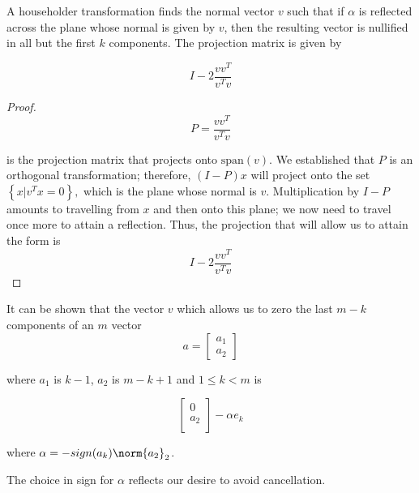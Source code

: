 \documentclass[../main.tex]{subfiles}
\begin{document}
\begin{proposition}
    A householder transformation finds the normal vector $v$ such that if $\alpha$ is reflected across the plane whose normal is given by $v$, then the resulting vector is nullified in all but the first $k$ components. The projection matrix is given by 

    \[
        I - 2 \frac{v v^T}{v^Tv}
    \]
\end{proposition}
\begin{proof}
    \[
        P = \frac{vv^T}{v^Tv}
    \]

    is the projection matrix that projects onto $\text{span}(v)$. We established that $P$ is an orthogonal transformation; therefore, $(I - P)x$ will project onto the set $\left\{ x | v^Tx = 0 \right\},$ which is the plane whose normal is $v$. Multiplication by $I - P$ amounts to travelling from $x$ and then onto this plane; we now need to travel once more to attain a reflection. Thus, the projection that will allow us to attain the form is
    \[
        I - 2 \frac{v v^T}{v^Tv}
    \]
\end{proof}

\begin{proposition}
    It can be shown that the vector $v$ which allows us to zero the last $m-k$ components of an $m$ vector 
    \[
        a = \begin{bmatrix}
            a_1 \\
            a_2
        \end{bmatrix}
    \]
    
    where $a_1$ is $k-1$, $a_2$ is $m-k+1$ and $1 \leq k < m$ is

    \[
        \begin{bmatrix}
            0 \\
            a_2 \\
        \end{bmatrix} - \alpha e_k
    \]

    where $\alpha = -sign(a_k)\norm{a_2}_2$.

    The choice in sign for $\alpha$ reflects our desire to avoid cancellation.
\end{proposition}
\end{document}
